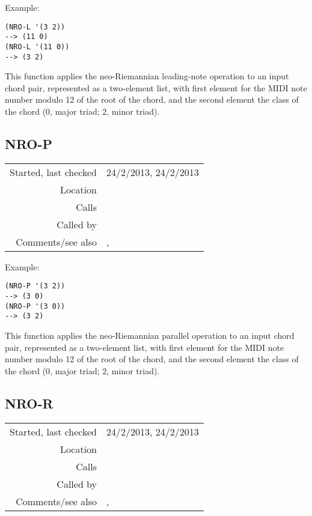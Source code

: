 \vspace{0.5cm}
\noindent Example:
\begin{verbatim}
(NRO-L '(3 2))
--> (11 0)
(NRO-L '(11 0))
--> (3 2)
\end{verbatim}

\noindent This function applies the neo-Riemannian
leading-note operation to an input chord pair,
represented as a two-element list, with first element
for the MIDI note number modulo 12 of the root of the
chord, and the second element the class of the chord
(0, major triad; 2, minor triad).


\subsection*{NRO-P}\label{fun:NRO-P}

\vspace{0.3cm}
\begin{tabular}{r|p{8cm}}
Started, last checked & 24/2/2013, 24/2/2013 \\
Location & \nameref{sec:NRO} \\
Calls & \\
Called by & \nameref{fun:NRO-string2chord-pairs} \\
Comments/see also & \nameref{fun:NRO-L}, \nameref{fun:NRO-R}
\end{tabular}

\vspace{0.5cm}
\noindent Example:
\begin{verbatim}
(NRO-P '(3 2))
--> (3 0)
(NRO-P '(3 0))
--> (3 2)
\end{verbatim}

\noindent This function applies the neo-Riemannian
parallel operation to an input chord pair, represented
as a two-element list, with first element for the MIDI
note number modulo 12 of the root of the chord, and
the second element the class of the chord (0, major
triad; 2, minor triad).


\subsection*{NRO-R}\label{fun:NRO-R}

\vspace{0.3cm}
\begin{tabular}{r|p{8cm}}
Started, last checked & 24/2/2013, 24/2/2013 \\
Location & \nameref{sec:NRO} \\
Calls & \\
Called by & \nameref{fun:NRO-string2chord-pairs} \\
Comments/see also & \nameref{fun:NRO-L}, \nameref{fun:NRO-P}
\end{tabular}

